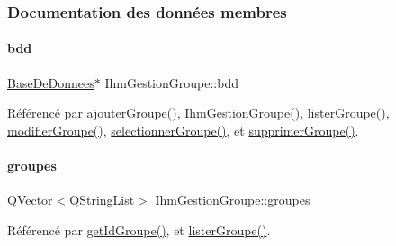 \subsubsection{Documentation des données membres}
\mbox{\label{class_ihm_gestion_groupe_a4f0049a7046abe7530d7f7eaed7ed2bc}} 
\paragraph{\texorpdfstring{bdd}{bdd}}
{\footnotesize\ttfamily \hyperlink{class_base_de_donnees}{Base\+De\+Donnees}$\ast$ Ihm\+Gestion\+Groupe\+::bdd\hspace{0.3cm}{\ttfamily [private]}}



Référencé par \hyperlink{class_ihm_gestion_groupe_a5e5b11cb395970f64b30427ccb2ecf4d}{ajouter\+Groupe()}, \hyperlink{class_ihm_gestion_groupe_a27632f9cf5b66f4403c3534ee0e0ad18}{Ihm\+Gestion\+Groupe()}, \hyperlink{class_ihm_gestion_groupe_a7afabe81c405b35e7cfd4e760eda8c84}{lister\+Groupe()}, \hyperlink{class_ihm_gestion_groupe_a810c186bf38dab776c7167c85671b268}{modifier\+Groupe()}, \hyperlink{class_ihm_gestion_groupe_a322f2c8584ae8e5be7f2075b73905beb}{selectionner\+Groupe()}, et \hyperlink{class_ihm_gestion_groupe_a08bdd132a37ac574b15d00e4dc959d7f}{supprimer\+Groupe()}.

\mbox{\label{class_ihm_gestion_groupe_af2d05c88db3e19452e70727446635bc4}} 
\paragraph{\texorpdfstring{groupes}{groupes}}
{\footnotesize\ttfamily Q\+Vector$<$Q\+String\+List$>$ Ihm\+Gestion\+Groupe\+::groupes\hspace{0.3cm}{\ttfamily [private]}}



Référencé par \hyperlink{class_ihm_gestion_groupe_a0f6dd8f645a5bf789521a25322004146}{get\+Id\+Groupe()}, et \hyperlink{class_ihm_gestion_groupe_a7afabe81c405b35e7cfd4e760eda8c84}{lister\+Groupe()}.

\mbox{\label{class_ihm_gestion_groupe_a9785ad3dadc1d2cad8558ca8b682dffd}} 
